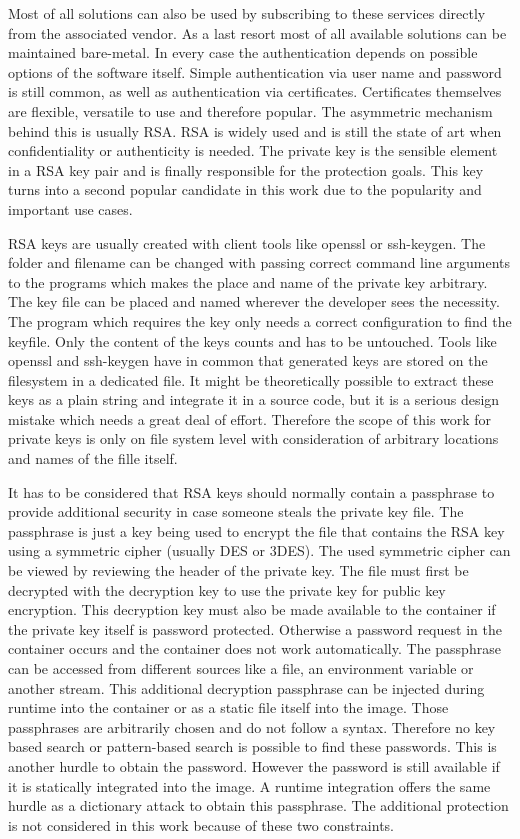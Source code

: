 Most of all solutions can also be used by subscribing to these services directly from the associated vendor.
As a last resort most of all available solutions can be maintained bare-metal.
In every case the authentication depends on possible options of the software itself. 
Simple authentication via user name and password is still common, as well as authentication via certificates.
Certificates themselves are flexible, versatile to use and therefore popular. 
The asymmetric mechanism behind this is usually RSA. 
RSA is widely used and is still the state of art when confidentiality or authenticity is needed. 
The private key is the sensible element in a RSA key pair and is finally responsible for the protection goals.
This key turns into a second popular candidate in this work due to the popularity and important use cases.

RSA keys are usually created with client tools like openssl or ssh-keygen.
The folder and filename can be changed with passing correct command line arguments to the programs which makes the place and name of the private key arbitrary.
The key file can be placed and named wherever the developer sees the necessity. 
The program which requires the key only needs a correct configuration to find the keyfile. 
Only the content of the keys counts and has to be untouched. 
Tools like openssl and ssh-keygen have in common that generated keys are stored on the filesystem in a dedicated file. 
It might be theoretically possible to extract these keys as a plain string and integrate it in a source code, but it is a serious design mistake which needs a great deal of effort. 
Therefore the scope of this work for private keys is only on file system level with consideration of arbitrary locations and names of the fille itself.

It has to be considered that RSA keys should normally contain a passphrase to provide additional security in case someone steals the private key file.
The passphrase is just a key being used to encrypt the file that contains the RSA key using a symmetric cipher (usually DES or 3DES). 
The used symmetric cipher can be viewed by reviewing the header of the private key. 
The file must first be decrypted with the decryption key to use the private key for public key encryption.
This decryption key must also be made available to the container if the private key itself is password protected.
Otherwise a password request in the container occurs and the container does not work automatically.
The passphrase can be accessed from different sources like a file, an environment variable or another stream.
This additional decryption passphrase can be injected during runtime into the container or as a static file itself into the image. 
Those passphrases are arbitrarily chosen and do not follow a syntax.
Therefore no key based search or pattern-based search is possible to find these passwords. 
This is another hurdle to obtain the password. 
However the password is still available if it is statically integrated into the image. 
A runtime integration offers the same hurdle as a dictionary attack to obtain this passphrase.
The additional protection is not considered in this work because of these two constraints.
 
